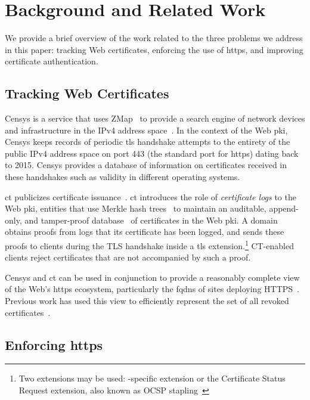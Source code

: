 \section{Background and Related Work}
\label{sec:background}

We provide a brief overview of the work related to the three problems we address
in this paper: tracking Web certificates, enforcing the use of \ac{https}, and
improving certificate authentication.

\subsection{Tracking Web Certificates}\label{sec:tracking}

Censys is a service that uses ZMap~\cite{durumeric2013zmap} to provide a search
engine of network devices and infrastructure in the IPv4 address
space~\cite{durumeric2015search}. In the context of the Web \ac{pki}, Censys
keeps records of periodic \ac{tls} handshake attempts to the entirety of the
public IPv4 address space on port 443 (the standard port for \ac{https}) dating
back to 2015. Censys provides a database of information on certificates received
in these handshakes such as validity in different operating systems.

\acf{ct} publicizes certificate issuance~\cite{rfc6962}. \ac{ct} introduces the
role of \emph{certificate logs} to the Web \ac{pki}, entities that use Merkle
hash trees~\cite{merkle1988digital} to maintain an auditable, append-only, and
tamper-proof database~\cite{crosby2009efficient} of certificates in the Web
\ac{pki}. A domain obtains proofs from logs that its certificate has been
logged, and sends these proofs to clients during the TLS handshake inside a
\ac{tls} extension.\footnote{Two extensions may be used: -specific
extension or the Certificate Status Request extension, also known as OCSP
stapling~\cite{rfc6066}} CT-enabled clients reject certificates that are not
accompanied by such a proof.

Censys and \ac{ct} can be used in conjunction to provide a reasonably complete
view of the Web's \ac{https} ecosystem, particularly the \acp{fqdn} of sites
deploying HTTPS~\cite{vandersloot2016towards}. Previous work has used this view
to efficiently represent the set of all revoked
certificates~\cite{larisch2017crlite}.

\subsection{Enforcing \ac{https}}
\label{sec:background:https}

